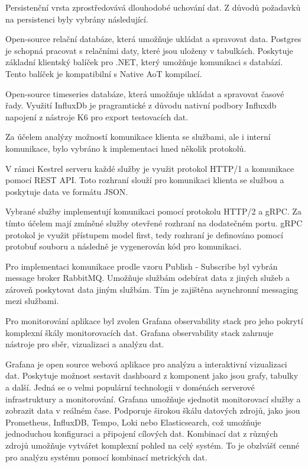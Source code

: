 
Persistenční vrsta zprostředovává dlouhodobé uchování dat. Z důvodů požadavků na persistenci byly vybrány následující.


Open-source relační databáze, která umožňuje ukládat a spravovat data. Postgres je schopná pracovat s relačními daty, které jsou uloženy v tabulkách. Poskytuje základní klientský balíček pro .NET, který umožňuje komunikaci s databází. Tento balíček je kompatibilní s Native AoT kompilací.


Open-source timeseries databáze, která umožňuje ukládat a spravovat časové řady. Využití InfluxDb je pragramtické z důvodu nativní podbory Influxdb napojení z nástroje K6 pro export testovacích dat.


Za účelem analýzy možností komunikace klienta se službami, ale i interní komunikace, bylo vybráno k implementaci hned několik protokolů. 

 V rámci Kestrel serveru každé služby je využit protokol HTTP/1 a komunikace pomocí REST API. Toto rozhraní slouží pro komunikaci klienta se službou a poskytuje data ve formátu JSON.

 Vybrané služby implementují komunikaci pomocí protokolu HTTP/2 a gRPC. Za tímto účelem mají zmíněné služby otevřené rozhraní na dodatečném portu. gRPC protokol je využit přístupem model first, tedy rozhraní je definováno pomocí protobuf souboru a následně je vygenerován kód pro komunikaci.

 Pro implementaci komunikace prodle vzoru Publish - Subscribe byl vybrán message broker RabbitMQ. Umožňuje službám odebírat data z jiných služeb a zároveň poskytovat data jiným službám. Tím je zajištěna asynchronní messaging mezi službami.


Pro monitorování aplikace byl zvolen Grafana observability stack pro jeho pokrytí komplexní škály monitorovacích dat. Grafana observability stack zahrnuje nástroje pro sběr, vizualizaci a analýzu dat.


Grafana je open source webová aplikace pro analýzu a interaktivní vizualizaci dat. Poskytuje možnost sestavit dashboard z komponent jako jsou grafy, tabulky a další. Jedná se o velmi populární technologii v doménách serverové infrastruktury a monitorování. Grafana umožňuje sjednotit monitorovací služby a zobrazit data v reálném čase. Podporuje širokou škálu datových zdrojů, jako jsou Prometheus, InfluxDB, Tempo, Loki nebo Elasticsearch, což umožňuje jednoduchou konfiguraci a připojení cílových dat. Kombinací dat z různých zdrojů umožňuje vytvářet komplexní pohled na celý systém. To je obzlvášť cenné pro analýzu systému pomocí kombinací metrických dat.

